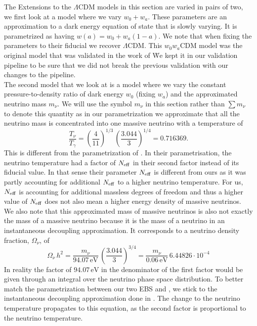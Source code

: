\documentclass[../main.tex]{subfiles}
\begin{document}
The Extensions to the $\Lambda$CDM models in this section are varied in pairs of two, we first look at a model where we vary $w_0+w_a$. These parameters are an approximation to a dark energy equation of state that is slowly varying. It is parametrized as having $w(a) = w_0 + w_a(1-a)$. We note that when fixing the parameters to their fiducial we recover $\Lambda$CDM. This $w_0w_a$CDM model was the original model that was validated in the work of \. We kept it in our validation pipeline to be sure that we did not break the previous validation with our changes to the pipeline.\\
The second model that we look at is a model where we vary the constant pressure-to-density ratio of dark energy $w_0$ (fixing $w_a$) and the approximated neutrino mass $m_\nu$. We will use the symbol $m_\nu$ in this section rather than $\sum m_\nu$ to denote this quantity as in our parametrization we approximate that all the neutrino mass is concentrated into one massive neutrino with a temperature of \begin{equation}
    \frac{T_\nu}{T_\gamma} = \left(\frac{4}{11}\right)^{1/3}\,\left(\frac{3.044}{3}\right)^{1/4} = 0.716369.
\end{equation}  
This is different from the parametrization of \cite{casas2023euclid}. In their parametrisation, the neutrino temperature had a factor of $N_\mathrm{eff}$ in their second factor instead of its fiducial value. In that sense their parameter $N_\mathrm{eff}$ is different from ours as it was partly accounting for additional $N_\mathrm{eff}$ to a higher neutrino temperature. For us, $N_\mathrm{eff}$ is accounting for additional massless degrees of freedom and thus a higher value of $N_\mathrm{eff}$ does not also mean a higher energy density of massive neutrinos.\\
We also note that this approximated mass of massive neutrinos is also not exactly the mass of a massive neutrino because it is the mass of a neutrino in an instantaneous decoupling approximation. It corresponds to a neutrino density fraction, $\Omega_\nu$, of 
\begin{equation}
    \label{eq:omega_nu}
    \Omega_\nu\,h^2= \frac{m_\nu}{94.07\,\mathrm{eV}}\,\left(\frac{3.044}{3}\right)^{3/4} = \frac{m_\nu}{0.06\,\mathrm{eV}}\,6.44826\cdot10^{-4}
\end{equation}
In reality the factor of $94.07\,\mathrm{eV}$ in the denominator of the first factor would be given through an integral over the neutrino phase space distribution. To better match the parametrization between our two EBS \class and \camb, we stick to the instantaneous decoupling approximation done in \camb. The change to the neutrino temperature propagates to this equation, as the second factor is proportional to the neutrino temperature.\\
\end{document}
